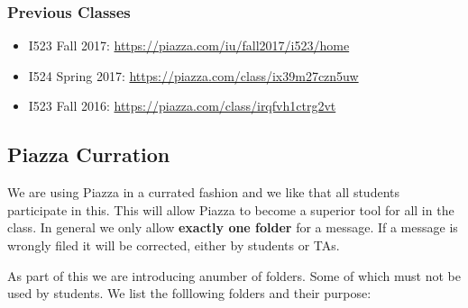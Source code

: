 \subsubsection{Previous Classes}

\begin{itemize}
\item  I523 Fall 2017:   \url{https://piazza.com/iu/fall2017/i523/home}
\item  I524 Spring 2017: \url{https://piazza.com/class/ix39m27czn5uw}
\item I523 Fall 2016:    \url{https://piazza.com/class/irqfvh1ctrg2vt}
\end{itemize}


\subsection{Piazza Curration}

We are using Piazza in a currated fashion and we like that all students
participate in this. This will allow Piazza to become a superior tool
for all in the class. In general we only allow \textbf{exactly one
folder} for a message. If a message is wrongly filed it will be
corrected, either by students or TAs.

As part of this we are introducing anumber of folders. Some of which must
not be used by students. We list the folllowing folders and their
purpose:

